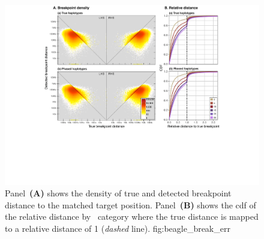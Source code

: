 

\begin{figure}[!htb]
\includegraphics[width=\textwidth]{./img/ch4/break_beagle_err_new}
{Panel~\textbf{(A)} shows the density of true and detected breakpoint distance to the matched target position.
Panel~\textbf{(B)} shows the \gls{cdf} of the relative distance by \fk{}~category where the true distance is mapped to a relative distance of 1 (\emph{dashed} line).\CorrectLabel}
{fig:beagle_break_err}
\end{figure}
